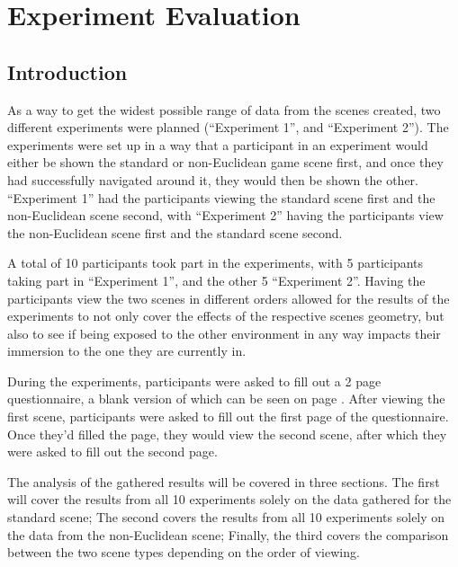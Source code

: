 \chapter[Experiment]{Experiment Evaluation}
\label{exp}

	\section{Introduction}
	\label{exp:intro}

		As a way to get the widest possible range of data from the scenes created, two different experiments were planned (\enquote{Experiment 1}, and \enquote{Experiment 2}).
		The experiments were set up in a way that a participant in an experiment would either be shown the standard or non-Euclidean game scene first, and once they had successfully navigated around it, they would then be shown the other.
		\enquote{Experiment 1} had the participants viewing the standard scene first and the non-Euclidean scene second, with \enquote{Experiment 2} having the participants view the non-Euclidean scene first and the standard scene second.

		A total of 10 participants took part in the experiments, with 5 participants taking part in \enquote{Experiment 1}, and the other 5 \enquote{Experiment 2}.
		Having the participants view the two scenes in different orders allowed for the results of the experiments to not only cover the effects of the respective scenes geometry, but also to see if being exposed to the other environment in any way impacts their immersion to the one they are currently in. %

		During the experiments, participants were asked to fill out a 2 page questionnaire, a blank version of which can be seen on page \pageref{appendix:question}.
		After viewing the first scene, participants were asked to fill out the first page of the questionnaire. Once they'd filled the page, they would view the second scene, after which they were asked to fill out the second page. %

		The analysis of the gathered results will be covered in three sections. The first will cover the results from all 10 experiments solely on the data gathered for the standard scene; The second covers the results from all 10 experiments solely on the data from the non-Euclidean scene; Finally, the third covers the comparison between the two scene types depending on the order of viewing. %


